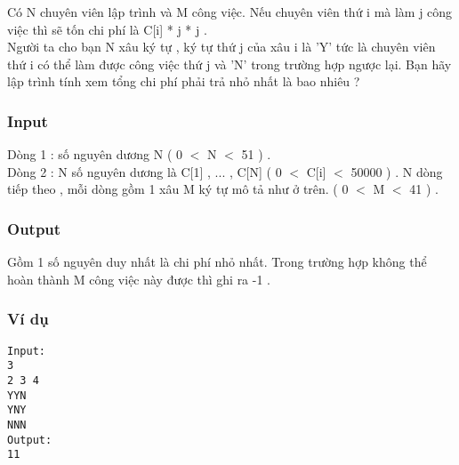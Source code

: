



   Có N chuyên viên lập trình và M công việc. Nếu chuyên viên thứ i mà làm j công việc thì sẽ tốn chi phí là C[i] * j * j .   
\\   Người ta cho bạn N xâu ký tự , ký tự thứ j của xâu i là 'Y' tức là chuyên viên thứ i có thể làm được công việc thứ j và 'N' trong trường hợp ngược lại. Bạn hãy lập trình tính xem tổng chi phí phải trả nhỏ nhất là bao nhiêu ?  

\subsubsection{   Input  }

   Dòng 1 : số nguyên dương N ( 0 $<$ N $<$ 51 ) .   
\\   Dòng 2 : N số nguyên dương là C[1] , ... , C[N] ( 0 $<$ C[i] $<$ 50000 ) . N dòng tiếp theo , mỗi dòng gồm 1 xâu M ký tự mô tả như ở trên. ( 0 $<$ M $<$ 41 ) .  

\subsubsection{   Output  }

   Gồm 1 số nguyên duy nhất là chi phí nhỏ nhất. Trong trường hợp không thể hoàn thành M công việc này được thì ghi ra -1 .  

\subsubsection{   Ví dụ  }
\begin{verbatim}
Input:
3
2 3 4
YYN
YNY
NNN
Output:
11
\end{verbatim}